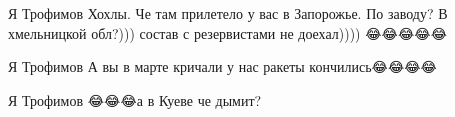  
 
 
 
 


Я Трофимов
Хохлы. Че там прилетело у вас в Запорожье. По заводу? В хмельницкой обл?))) состав с резервистами не доехал)))) 😂😂😂😂😂

Я Трофимов
А вы в марте кричали у нас ракеты кончились😂😂😂😂

Я Трофимов
😂😂😂а в Куеве че дымит? 🤣🤣🤣
